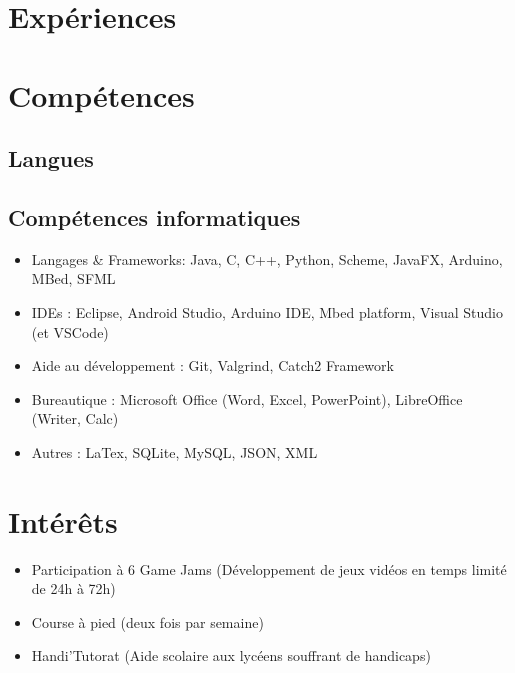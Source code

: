 \documentclass[11pt, a4paper, sans]{moderncv}
\begin{document}
\section{Expériences}

\section{Compétences}
\subsection{Langues}
\subsection{Compétences informatiques}
	\begin{itemize}
		\setlength\itemsep{0mm}
		\item Langages \& Frameworks: Java, C, C++, Python, Scheme, JavaFX, Arduino, MBed, SFML
		\item IDEs : Eclipse, Android Studio, Arduino IDE, Mbed platform, Visual Studio (et VSCode)
		\item Aide au développement : Git, Valgrind, Catch2 Framework
		\item Bureautique : Microsoft Office (Word, Excel, PowerPoint), LibreOffice (Writer, Calc)
		\item Autres : LaTex, SQLite, MySQL, JSON, XML
	\end{itemize}

\section{Intérêts}
\begin{itemize}[label=\textbullet]
	\setlength\itemsep{0mm}
	\item Participation à 6 Game Jams (Développement de jeux vidéos en temps limité de 24h à 72h)
	\item Course à pied (deux fois par semaine)
	\item Handi'Tutorat (Aide scolaire aux lycéens souffrant de handicaps)
\end{itemize}
\end{document}
